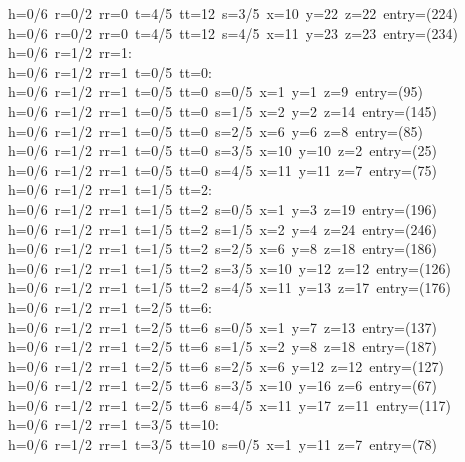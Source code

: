 \begin{tabbing}
h=0/6\ r=0/2\ rr=0\ t=4/5\ tt=12\ s=3/5\ x=10\ y=22\ z=22\ entry=(224)\\[0pt]
h=0/6\ r=0/2\ rr=0\ t=4/5\ tt=12\ s=4/5\ x=11\ y=23\ z=23\ entry=(234)\\[0pt]
h=0/6\ r=1/2\ rr=1:\\[0pt]
h=0/6\ r=1/2\ rr=1\ t=0/5\ tt=0:\\[0pt]
h=0/6\ r=1/2\ rr=1\ t=0/5\ tt=0\ s=0/5\ x=1\ y=1\ z=9\ entry=(95)\\[0pt]
h=0/6\ r=1/2\ rr=1\ t=0/5\ tt=0\ s=1/5\ x=2\ y=2\ z=14\ entry=(145)\\[0pt]
h=0/6\ r=1/2\ rr=1\ t=0/5\ tt=0\ s=2/5\ x=6\ y=6\ z=8\ entry=(85)\\[0pt]
h=0/6\ r=1/2\ rr=1\ t=0/5\ tt=0\ s=3/5\ x=10\ y=10\ z=2\ entry=(25)\\[0pt]
h=0/6\ r=1/2\ rr=1\ t=0/5\ tt=0\ s=4/5\ x=11\ y=11\ z=7\ entry=(75)\\[0pt]
h=0/6\ r=1/2\ rr=1\ t=1/5\ tt=2:\\[0pt]
h=0/6\ r=1/2\ rr=1\ t=1/5\ tt=2\ s=0/5\ x=1\ y=3\ z=19\ entry=(196)\\[0pt]
h=0/6\ r=1/2\ rr=1\ t=1/5\ tt=2\ s=1/5\ x=2\ y=4\ z=24\ entry=(246)\\[0pt]
h=0/6\ r=1/2\ rr=1\ t=1/5\ tt=2\ s=2/5\ x=6\ y=8\ z=18\ entry=(186)\\[0pt]
h=0/6\ r=1/2\ rr=1\ t=1/5\ tt=2\ s=3/5\ x=10\ y=12\ z=12\ entry=(126)\\[0pt]
h=0/6\ r=1/2\ rr=1\ t=1/5\ tt=2\ s=4/5\ x=11\ y=13\ z=17\ entry=(176)\\[0pt]
h=0/6\ r=1/2\ rr=1\ t=2/5\ tt=6:\\[0pt]
h=0/6\ r=1/2\ rr=1\ t=2/5\ tt=6\ s=0/5\ x=1\ y=7\ z=13\ entry=(137)\\[0pt]
h=0/6\ r=1/2\ rr=1\ t=2/5\ tt=6\ s=1/5\ x=2\ y=8\ z=18\ entry=(187)\\[0pt]
h=0/6\ r=1/2\ rr=1\ t=2/5\ tt=6\ s=2/5\ x=6\ y=12\ z=12\ entry=(127)\\[0pt]
h=0/6\ r=1/2\ rr=1\ t=2/5\ tt=6\ s=3/5\ x=10\ y=16\ z=6\ entry=(67)\\[0pt]
h=0/6\ r=1/2\ rr=1\ t=2/5\ tt=6\ s=4/5\ x=11\ y=17\ z=11\ entry=(117)\\[0pt]
h=0/6\ r=1/2\ rr=1\ t=3/5\ tt=10:\\[0pt]
h=0/6\ r=1/2\ rr=1\ t=3/5\ tt=10\ s=0/5\ x=1\ y=11\ z=7\ entry=(78)\\[0pt]

\end{tabbing}

